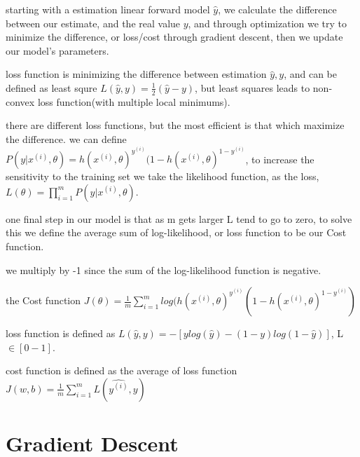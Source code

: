 \documentclass[4apaper,12pt]{book}
\begin{document}
  \begin{description}
  \item starting with a estimation linear forward model $\hat{y}$, we calculate the difference between our estimate, and the real value $y$, and through optimization we try to minimize the difference, or loss/cost through gradient descent, then we update our model's parameters.
  \item loss function is minimizing the difference between estimation ${\hat{y}, y}$, and can be defined as least squre $L(\hat{y}, y)=\frac{1}{2}(\hat{y} - y)$, but least squares leads to non-convex loss function(with multiple local minimums).
  \item there are different loss functions, but the most efficient is that which maximize the difference. we can define $P(y|x^{(i)}, \theta) = h(x^{(i)},\theta)^{y^{(i)}}(1-h(x^{(i)},\theta)^{1-y^{(i)}}$, to increase the sensitivity to the training set we take the likelihood function, as the loss, $L(\theta)=\prod_{i=1}^mP(y|x^{(i)}, \theta)$.
  \item one final step in our model is that as m gets larger L tend to go to zero, to solve this we define the average sum of log-likelihood, or loss function to be our Cost function.
  \item we multiply by -1 since the sum of the log-likelihood function is negative.
  \item the Cost function  $J(\theta)=\frac{1}{m}\sum_{i=1}^{m}log(h(x^{(i)},\theta)^{y^{(i)}}(1-h(x^{(i)},\theta)^{1-y^{(i)}})$

  \item loss function is defined as $L(\hat{y}, y)=-[ylog(\hat{y}) - (1-y)log(1-\hat{y})]$, L$\in[0-1]$.

  \item cost function is defined as the average of loss function $J(w,b)=\frac{1}{m}\sum_{i=1}^{m}L(\hat{y^{(i)}}, y)$
  \end{description}

  \section{Gradient Descent}
\end{document}
